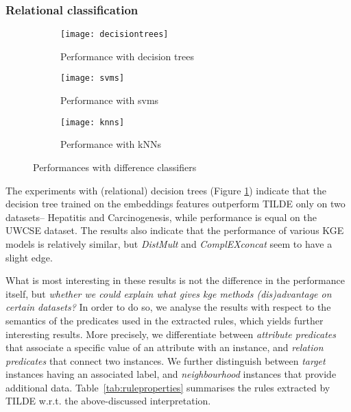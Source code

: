 \subsubsection{Relational classification}


\begin{figure}[!htb]
	\centering
	\begin{subfigure}{0.98\linewidth}
		\centering
		\texttt{[image: decisiontrees]}
		\caption{Performance with decision trees\label{fig:dtres}}
	\end{subfigure}

	\begin{subfigure}{0.98\linewidth}
		\centering
		\texttt{[image: svms]}

		\caption{Performance with svms\label{fig:svms}}
	\end{subfigure}

	\begin{subfigure}{0.98\linewidth}
		\centering
		\texttt{[image: knns]}

		\caption{Performance with kNNs\label{fig:knns}}
	\end{subfigure}

	\caption{Performances with difference classifiers}
\end{figure}








The experiments with (relational) decision trees (Figure \ref{fig:dtres}) indicate that the decision tree trained on the embeddings features outperform TILDE only on two datasets-- Hepatitis and Carcinogenesis, while performance is equal on the UWCSE dataset.
The results also indicate that the performance of various KGE models is relatively similar, but \textit{DistMult} and \textit{ComplEXconcat} seem to have a slight edge.



What is most interesting in these results is not the difference in the performance itself, but \textit{whether we could explain what gives \gls{kge} methods (dis)advantage on certain datasets?}
In order to do so, we analyse the results with respect to the semantics of the predicates used in the extracted rules, which yields further interesting results.
More precisely, we differentiate between \textit{attribute predicates} that associate a specific value of an attribute with an instance, and \textit{relation predicates} that connect two instances.
We further distinguish between \textit{target} instances having an associated label, and \textit{neighbourhood} instances that provide additional data.
Table~\ref{tab:ruleproperties} summarises the rules extracted by TILDE w.r.t. the above-discussed interpretation.



